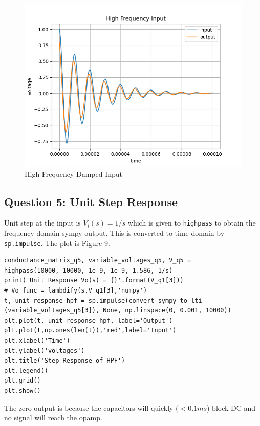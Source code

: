 \documentclass[11pt, a4paper]{article}
\begin{document}
  \begin{figure}[!tbh]
   	\centering
  \includegraphics[scale=0.5]{q4-2.png} 
    \caption{High Frequency Damped Input} 	
   \end{figure} 
   
\subsection{Question 5: Unit Step Response}
Unit step at the input is $V_i(s)=1/s$ which is given to \texttt{highpass} to obtain the frequency domain sympy output. This is converted to time domain by \texttt{sp.impulse}. The plot is Figure 9.   

\begin{verbatim}
conductance_matrix_q5, variable_voltages_q5, V_q5 = 
highpass(10000, 10000, 1e-9, 1e-9, 1.586, 1/s)
print('Unit Response Vo(s) = {}'.format(V_q1[3]))
# Vo_func = lambdify(s,V_q1[3],'numpy')
t, unit_response_hpf = sp.impulse(convert_sympy_to_lti
(variable_voltages_q5[3]), None, np.linspace(0, 0.001, 10000))
plt.plot(t, unit_response_hpf, label='Output')
plt.plot(t,np.ones(len(t)),'red',label='Input')
plt.xlabel('Time')
plt.ylabel('voltages')
plt.title('Step Response of HPF')
plt.legend()
plt.grid()
plt.show()
\end{verbatim}

The zero output is because the capacitors will quickly ($< 0.1 ms$) block DC and no signal will reach the opamp. 
\end{document}
